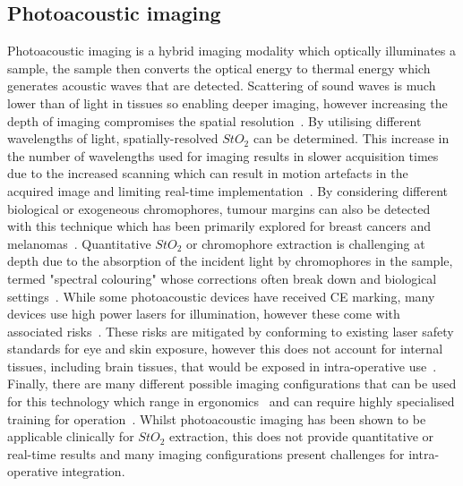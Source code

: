 \subsection{Photoacoustic imaging}
Photoacoustic imaging is a hybrid imaging modality which optically illuminates a sample, the sample then converts the optical energy to thermal energy which generates acoustic waves that are detected. Scattering of sound waves is much lower than of light in tissues so enabling deeper imaging, however increasing the depth of imaging compromises the spatial resolution~\citep{Assi2023}. By utilising different wavelengths of light, spatially-resolved $StO_2$ can be determined. This increase in the number of wavelengths used for imaging results in slower acquisition times due to the increased scanning which can result in motion artefacts in the acquired image and limiting real-time implementation~\citep{Assi2023, Attia2019}. By considering different biological or exogeneous chromophores, tumour margins can also be detected with this technique which has been primarily explored for breast cancers and melanomas~\citep{Assi2023, Attia2019, Taylor-Williams2022}. Quantitative $StO_2$ or chromophore extraction is challenging at depth due to the absorption of the incident light by chromophores in the sample, termed "spectral colouring" whose corrections often break down and biological settings~\citep{Assi2023, Taylor-Williams2022}. While some photoacoustic devices have received CE marking, many devices use high power lasers for illumination, however these come with associated risks~\citep{Assi2023}. These risks are mitigated by conforming to existing laser safety standards for eye and skin exposure, however this does not account for internal tissues, including brain tissues, that would be exposed in intra-operative use~\citep{Assi2023}. Finally, there are many different possible imaging configurations that can be used for this technology which range in ergonomics~\citep{Attia2019} and can require highly specialised training for operation~\citep{Assi2023}. Whilst photoacoustic imaging has been shown to be applicable clinically for $StO_2$ extraction, this does not provide quantitative or real-time results and many imaging configurations present challenges for intra-operative integration. 

